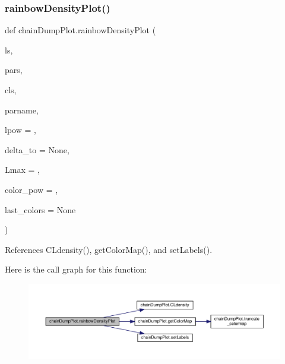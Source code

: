 \mbox{\label{namespacechainDumpPlot_a2f98303b7ab27e2bf0bf6831e673b79f}} 
\subsubsection{\texorpdfstring{rainbow\+Density\+Plot()}{rainbowDensityPlot()}}
{\footnotesize\ttfamily def chain\+Dump\+Plot.\+rainbow\+Density\+Plot (\begin{DoxyParamCaption}\item[{}]{ls,  }\item[{}]{pars,  }\item[{}]{cls,  }\item[{}]{parname,  }\item[{}]{lpow = {},  }\item[{}]{delta\+\_\+to = {\ttfamily None},  }\item[{}]{Lmax = {},  }\item[{}]{color\+\_\+pow = {},  }\item[{}]{last\+\_\+colors = {\ttfamily None} }\end{DoxyParamCaption})}



References C\+Ldensity(), get\+Color\+Map(), and set\+Labels().

Here is the call graph for this function\+:
\nopagebreak
\begin{figure}[H]
\begin{center}
\leavevmode
\includegraphics[width=350pt]{namespacechainDumpPlot_a2f98303b7ab27e2bf0bf6831e673b79f_cgraph}
\end{center}
\end{figure}
\mbox{\label{namespacechainDumpPlot_a545569f988e5fb4e1743898514441b06}} 
